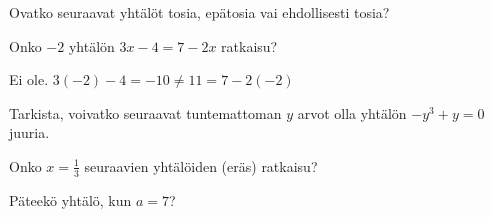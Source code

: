 \begin{tehtavasivu}


\begin{tehtava}
Ovatko seuraavat yhtälöt tosia, epätosia vai ehdollisesti tosia?

     \begin{vastaus}
    \end{vastaus}
\end{tehtava}

\begin{tehtava}
Onko $-2$ yhtälön $3x-4 = 7-2x$ ratkaisu?
\begin{vastaus}
Ei ole. $3(-2)-4 = -10 \ne 11=7-2(-2)$
\end{vastaus}
\end{tehtava}

\begin{tehtava}
Tarkista, voivatko seuraavat tuntemattoman $y$ arvot olla yhtälön $-y^3+y=0$ juuria.

  \begin{vastaus}
  \end{vastaus}
\end{tehtava}


\begin{tehtava}
Onko $x=\frac{1}{3}$ seuraavien yhtälöiden (eräs) ratkaisu?

  \begin{vastaus}
  \end{vastaus}
\end{tehtava}

\begin{tehtava}
Päteekö yhtälö, kun $a=7$?
    \begin{vastaus}
    \end{vastaus}
\end{tehtava}


\end{tehtavasivu}
